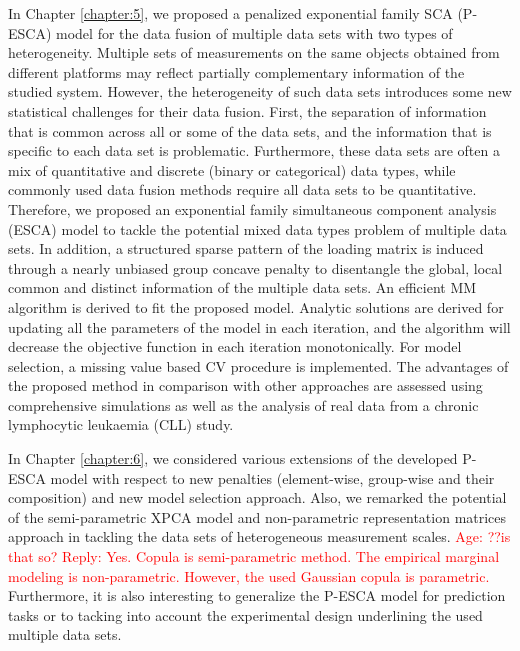 In Chapter \ref{chapter:5}, we proposed a penalized exponential family SCA (P-ESCA) model for the data fusion of multiple data sets with two types of heterogeneity. Multiple sets of measurements on the same objects obtained from different platforms may reflect partially complementary information of the studied system. However, the heterogeneity of such data sets introduces some new statistical challenges for their data fusion. First, the separation of information that is common across all or some of the data sets, and the information that is specific to each data set is problematic. Furthermore, these data sets are often a mix of quantitative and discrete (binary or categorical) data types, while commonly used data fusion methods require all data sets to be quantitative. Therefore, we proposed an exponential family simultaneous component analysis (ESCA) model to tackle the potential mixed data types problem of multiple data sets. In addition, a structured sparse pattern of the loading matrix is induced through a nearly unbiased group concave penalty to disentangle the global, local common and distinct information of the multiple data sets. An efficient MM algorithm is derived to fit the proposed model. Analytic solutions are derived for updating all the parameters of the model in each iteration, and the algorithm will decrease the objective function in each iteration monotonically. For model selection, a missing value based CV procedure is implemented. The advantages of the proposed method in comparison with other approaches are assessed using comprehensive simulations as well as the analysis of real data from a chronic lymphocytic leukaemia (CLL) study.

In Chapter \ref{chapter:6}, we considered various extensions of the developed P-ESCA model with respect to new penalties (element-wise, group-wise and their composition) and new model selection approach. Also, we remarked the potential of the semi-parametric XPCA model and non-parametric representation matrices approach in tackling the data sets of heterogeneous measurement scales. \textcolor{red}{Age: ??is that so? Reply: Yes. Copula is semi-parametric method. The empirical marginal modeling is non-parametric. However, the used Gaussian copula is parametric.} Furthermore, it is also interesting to generalize the P-ESCA model for prediction tasks or to tacking into account the experimental design underlining the used multiple data sets.



